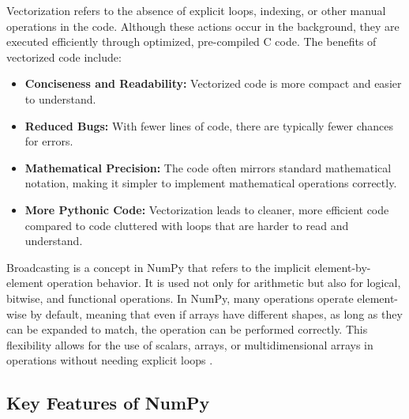 Vectorization refers to the absence of explicit loops, indexing, or other manual operations in the code. Although these actions occur in the background, they are executed efficiently through optimized, pre-compiled C code. The benefits of vectorized code include:

\begin{itemize}
	\item \textbf{Conciseness and Readability:} Vectorized code is more compact and easier to understand.
	\item \textbf{Reduced Bugs:} With fewer lines of code, there are typically fewer chances for errors.
	\item \textbf{Mathematical Precision:} The code often mirrors standard mathematical notation, making it simpler to implement mathematical operations correctly.
	\item \textbf{More Pythonic Code:} Vectorization leads to cleaner, more efficient code compared to code cluttered with loops that are harder to read and understand.
\end{itemize}

Broadcasting is a concept in NumPy that refers to the implicit element-by-element operation behavior. It is used not only for arithmetic but also for logical, bitwise, and functional operations. In NumPy, many operations operate element-wise by default, meaning that even if arrays have different shapes, as long as they can be expanded to match, the operation can be performed correctly. This flexibility allows for the use of scalars, arrays, or multidimensional arrays in operations without needing explicit loops \cite{NumPy:2024}.

\subsection{Key Features of NumPy}

